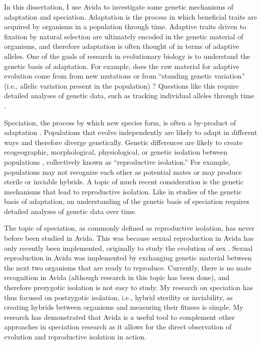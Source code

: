 \begin{doublespace}
In this dissertation, I use Avida to investigate
some genetic mechanisms of adaptation and speciation.
%
Adaptation is the process in which beneficial traits
are acquired by organisms in a population through time.
%
Adaptive traits driven to fixation by natural selection
are ultimately encoded in the genetic material of organisms,
and therefore adaptation is often thought of in terms of adaptive alleles.
%
One of the goals of research in evolutionary biology
is to understand the genetic basis of adaptation.
%
For example, does the raw material for adaptive evolution
come from from new mutations or from ``standing genetic variation''
(i.e., allelic variation present in the population) \citep{orr05}?
%
Questions like this require detailed analyses of genetic data,
such as tracking individual alleles through time \citep{bar08}.



Speciation, the process by which new species form,
is often a by-product of adaptation \citep{coy04,sch09,sob10}.
%
Populations that evolve independently are likely to adapt in different ways
and therefore diverge genetically.
%
Genetic differences are likely to create ecogeographic, morphological,
physiological, or genetic isolation between populations \citep{coy04,sch10},
collectively known as ``reproductive isolation.''
%
For example, populations may not recognize each other as potential mates
or may produce sterile or inviable hybrids.
%
A topic of much recent consideration
is the genetic mechanisms that lead to reproductive isolation.
%
Like in studies of the genetic basis of adaptation,
an understanding of the genetic basis of speciation
requires detailed analyses of genetic data over time.



The topic of speciation, as commonly defined as reproductive isolation,
has never before been studied in Avida.
%
This was because sexual reproduction in Avida has only recently
been implemented, originally to study the evolution of sex
\citep{mis04,mis06,mis10}.
%
Sexual reproduction in Avida was implemented by exchanging genetic material
between the next two organisms that are ready to reproduce.
%
Currently, there is no mate recognition in Avida
(although research in this topic has been done),
and therefore prezygotic isolation is not easy to study.
%
My research on speciation has thus focused on postzygotic isolation,
i.e., hybrid sterility or inviability,
as creating hybrids between organisms and measuring their fitness is simple.
%
My research has demonstrated that Avida is a useful tool to complement
other approaches in speciation research as it allows for
the direct observation of evolution and reproductive isolation in action.




\end{doublespace}
